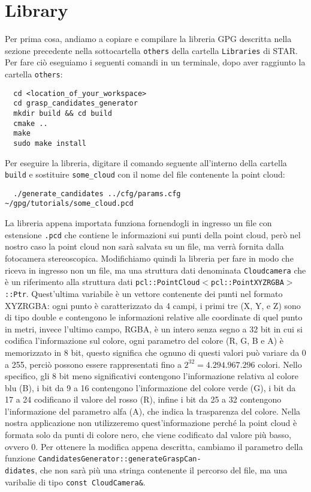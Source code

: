 \documentclass{report}
\begin{document}
\section{Library}
Per prima cosa, andiamo a copiare e compilare la libreria GPG descritta nella sezione precedente nella sottocartella \texttt{others} della cartella \texttt{Libraries} di STAR. Per fare ciò eseguiamo i seguenti comandi in un terminale, dopo aver raggiunto la cartella \texttt{others}:
\begin{verbatim}
  cd <location_of_your_workspace>  
  cd grasp_candidates_generator
  mkdir build && cd build
  cmake ..
  make
  sudo make install
\end{verbatim}
Per eseguire la libreria, digitare il comando seguente all'interno della cartella \texttt{build} e sostituire \texttt{some\_cloud} con il nome del file contenente la point cloud:
\begin{verbatim}
  ./generate_candidates ../cfg/params.cfg ~/gpg/tutorials/some_cloud.pcd
\end{verbatim}
La libreria appena importata funziona fornendogli in ingresso un file con estensione \texttt{.pcd} che contiene le informazioni sui punti della point cloud, però nel nostro caso la point cloud non sarà salvata su un file, ma verrà fornita dalla fotocamera stereoscopica. Modifichiamo quindi la libreria per fare in modo che riceva in ingresso non un file, ma una struttura dati denominata \texttt{Cloudcamera} che è un riferimento alla struttura dati \texttt{pcl::PointCloud$<$pcl::PointXYZRGBA$>$::Ptr}. Quest'ultima variabile è un vettore contenente dei punti nel formato XYZRGBA: ogni punto è caratterizzato da 4 campi, i primi tre (X, Y, e Z) sono di tipo double e contengono le informazioni relative alle coordinate di quel punto in metri, invece l'ultimo campo, RGBA, è un intero senza segno a 32 bit in cui si codifica l'informazione sul colore, ogni parametro del colore (R, G, B e A) è memorizzato in 8 bit, questo significa che ognuno di questi valori può variare da 0 a 255, perciò possono essere rappresentati fino a $\displaystyle{2^{32}=4.294.967.296}$ colori. Nello specifico, gli 8 bit meno significativi contengono l'informazione relativa al colore blu (B), i bit da 9 a 16 contengono l'informazione del colore verde (G), i bit da 17 a 24 codificano il valore del rosso (R), infine i bit da 25 a 32 contengono l'informazione del parametro alfa (A), che indica la trasparenza del colore. Nella nostra applicazione non utilizzeremo quest'informazione perché la point cloud è formata solo da punti di colore nero, che viene codificato dal valore più basso, ovvero 0. Per ottenere la modifica appena descritta, cambiamo il parametro della funzione \texttt{CandidatesGenerator::generateGraspCan-}\\\texttt{didates}, che non sarà più una stringa contenente il percorso del file, ma una varibalie di tipo \texttt{const CloudCamera\&}. \par
\end{document}
